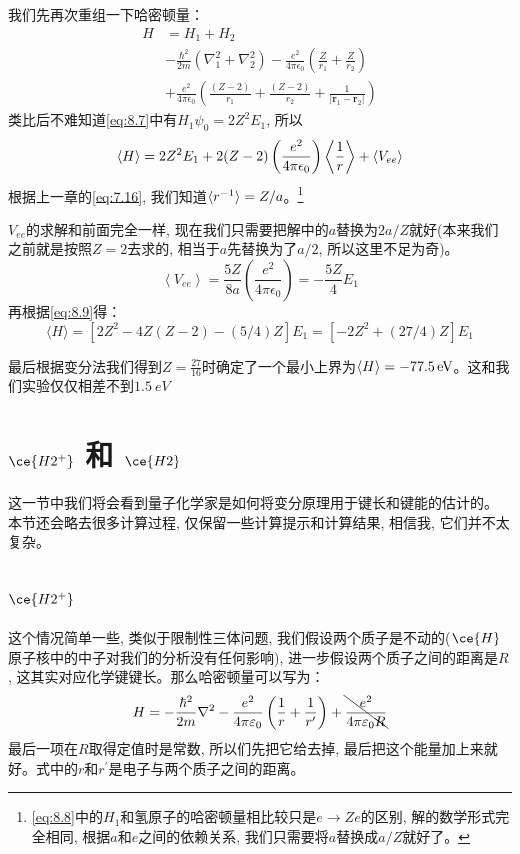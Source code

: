 \documentclass[a4paper,zihao=-4,linespread=1]{ctexrep}
\begin{document}
    我们先再次重组一下哈密顿量：
    \begin{equation}
        \label{eq:8.8}
        \begin{aligned}
            H &=H_1+H_2\\
            & -\frac{\hbar^{2}}{2 m}\left(\nabla_{1}^{2}+\nabla_{2}^{2}\right)-\frac{e^{2}}{4 \pi \epsilon_{0}}\left(\frac{Z}{r_{1}}+\frac{Z}{r_{2}}\right) \\
            & +\frac{e^{2}}{4 \pi \epsilon_{0}}\left(\frac{(Z-2)}{r_{1}}+\frac{(Z-2)}{r_{2}}+\frac{1}{\left|\mathbf{r}_{1}-\mathbf{r}_{2}\right|}\right)
        \end{aligned}
    \end{equation}
    类比后不难知道\ref{eq:8.7}中有$H_1\psi_0=2Z^2E_1$, 所以
    \begin{equation}
        \label{eq:8.9}
        \langle H\rangle=2 Z^{2} E_{1}+2(Z-2)\left(\frac{e^{2}}{4 \pi \epsilon_{0}}\right)\Braket{\frac{1}{r}}+\left\langle V_{e e}\right\rangle
    \end{equation}
    根据上一章的\ref{eq:7.16}, 我们知道$\braket{r^{-1}}=Z/a$。\footnote{\ref{eq:8.8}中的$H_1$和氢原子的哈密顿量相比较只是$e\to Ze$的区别, 解的数学形式完全相同, 根据$a$和$e$之间的依赖关系, 我们只需要将$a$替换成$a/Z$就好了。}
    
    $V_{ee}$的求解和前面完全一样, 现在我们只需要把解中的$a$替换为$2a/Z $就好(本来我们之前就是按照$Z=2$去求的, 相当于$a$先替换为了$a/2$, 所以这里不足为奇)。
    \[\left\langle V_{e e}\right\rangle=\frac{5 Z}{8 a}\left(\frac{e^{2}}{4 \pi \epsilon_{0}}\right)=-\frac{5 Z}{4} E_{1}\]
    再根据\ref{eq:8.9}得：
    \[\langle H\rangle=\left[2 Z^{2}-4 Z(Z-2)-(5 / 4) Z\right] E_{1}=\left[-2 Z^{2}+(27 / 4) Z\right] E_{1}\]
    
    最后根据变分法我们得到$Z=\frac{27}{16}$时确定了一个最小上界为$\braket{H}=\SI[]{-77.5}{eV}$。这和我们实验仅仅相差不到$\SI[]{1.5}{eV}$

    \section{$\ce{H2^+}$ 和 $\ce{H2}$}
    这一节中我们将会看到量子化学家是如何将变分原理用于键长和键能的估计的。
    本节还会略去很多计算过程, 仅保留一些计算提示和计算结果, 相信我, 它们并不太复杂。
    \subsection*{$\ce{H2^+}$}
    这个情况简单一些, 类似于限制性三体问题, 我们假设两个质子是不动的($\ce{H}$原子核中的中子对我们的分析没有任何影响), 进一步假设两个质子之间的距离是$R$, 
    这其实对应化学键键长。那么哈密顿量可以写为：
    \begin{equation}
        H=-\frac{\hbar^2}{2m}\nabla^2-\frac{e^2}{4\pi\varepsilon_0}\left(\frac{1}{r}+\frac{1}{r^\prime}\right)+\bcancel{\frac{e^2}{4\pi\varepsilon_0R}}
    \end{equation}
    最后一项在$R$取得定值时是常数, 所以们先把它给去掉, 最后把这个能量加上来就好。式中的$r$和$r^\prime$是电子与两个质子之间的距离。
\end{document}
